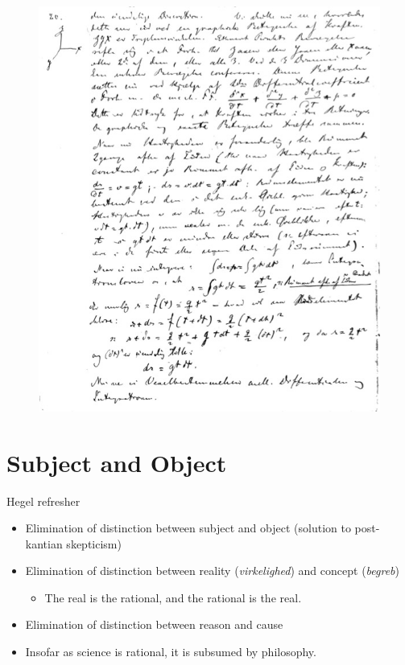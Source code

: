 \documentclass[ignorenonframetext, ]{beamer}
\begin{document}
\begin{frame}

\begin{figure}
\centering
\includegraphics[scale=0.4]{høffding2.jpg}
\end{figure}
\end{frame}

\section{Subject and Object}

\begin{frame}{Hegel refresher}

\begin{itemize}
\item Elimination of distinction between subject and object (solution
  to post-kantian skepticism)
\item Elimination of distinction between reality (\emph{virkelighed})
  and concept (\emph{begreb})
  \begin{itemize}
  \item The real is the rational, and the rational is the real.
  \end{itemize}
\item Elimination of distinction between reason and cause
\item Insofar as science is rational, it is subsumed by philosophy.
\end{itemize}

\end{frame}
\end{document}
